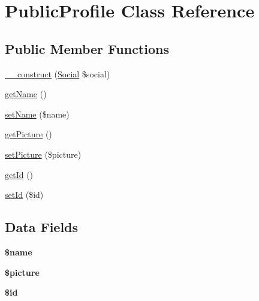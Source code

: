 \hypertarget{class_public_profile}{\section{Public\+Profile Class Reference}
\label{class_public_profile}
}
\subsection*{Public Member Functions}
\begin{DoxyCompactItemize}
\item 
\hyperlink{class_public_profile_ad07e6b7f7a6cd38bd1b21cf48da4a5d0}{\+\_\+\+\_\+construct} (\hyperlink{class_social}{Social} \$social)
\item 
\hyperlink{class_public_profile_a3d0963e68bb313b163a73f2803c64600}{get\+Name} ()
\item 
\hyperlink{class_public_profile_a2fe666694997d047711d7653eca2f132}{set\+Name} (\$name)
\item 
\hyperlink{class_public_profile_aa10a041137b00a6f0a79916f4009924f}{get\+Picture} ()
\item 
\hyperlink{class_public_profile_ad822b1785ceddeb91452e90dd910d2ee}{set\+Picture} (\$picture)
\item 
\hyperlink{class_public_profile_a12251d0c022e9e21c137a105ff683f13}{get\+Id} ()
\item 
\hyperlink{class_public_profile_a87313ad678fb2a2a8efb435cf0bdb9a0}{set\+Id} (\$id)
\end{DoxyCompactItemize}
\subsection*{Data Fields}
\begin{DoxyCompactItemize}
\item 
\hypertarget{class_public_profile_ab2fc40d43824ea3e1ce5d86dee0d763b}{{\bfseries \$name}}\label{class_public_profile_ab2fc40d43824ea3e1ce5d86dee0d763b}

\item 
\hypertarget{class_public_profile_a6ed313adb3a8ef1daf8fafdc842b09d1}{{\bfseries \$picture}}\label{class_public_profile_a6ed313adb3a8ef1daf8fafdc842b09d1}

\item 
\hypertarget{class_public_profile_ae97941710d863131c700f069b109991e}{{\bfseries \$id}}\label{class_public_profile_ae97941710d863131c700f069b109991e}

\end{DoxyCompactItemize}


